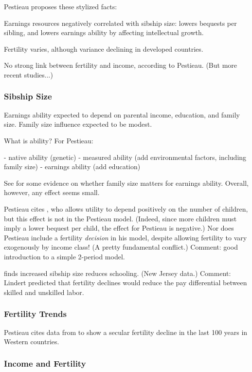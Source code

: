\documentclass{article}
\begin{document}
Pestieau proposes these stylized facts:

Earnings resources negatively correlated with sibship size:
lowers bequests per sibling,
and lowers earnings ability by affecting intellectual growth.

Fertility varies, although variance declining in developed countries.


No strong link between fertility and income, according to Pestieau.
(But more recent studies...)

\subsubsection{Sibship Size}

Earnings ability expected to depend on
parental income,
education,
and family size.
Family size influence expected to be modest.

What is ability?  For Pestieau:

- native ability (genetic)
- measured ability (add environmental factors, including family size)
- earnings ability (add education)

See \citet[Table 1]{pestieau-1984-oep} for some evidence
on whether family size matters for earnings ability.
Overall, however, any effect seems small.

Pestieau cites \citet{cigno-1983-oep},
who allows utility to depend positively on the number of children,
but this effect is not in the Pestieau model.
(Indeed, since more children must imply a lower bequest per child,
the effect for Pestieau is negative.)
Nor does Pestieau include a fertility \emph{decision} in his model,
despite allowing fertility to vary exogenously by income class!
(A pretty fundamental conflict.)
Comment: good introduction to a simple 2-period model.

\citet{lindert-1977-jhr} finds increased sibship size reduces schooling.
(New Jersey data.)
Comment: Lindert predicted that fertility declines would reduce the
pay differential between skilled and unskilled labor.



\subsubsection{Fertility Trends}

Pestieau cites data from \citet{festy-1979-ined} to show a secular fertility decline in the last 100 years in Western countries.

\subsubsection{Income and Fertility}
\end{document}
